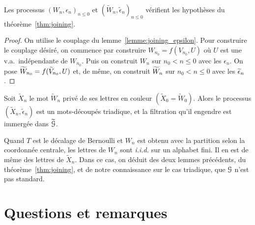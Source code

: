 \documentclass[12pt,a4paper]{article}
\begin{document}
\begin{lemme}
Les processus ${(W_n, \epsilon_n)}_{n \leq 0}$ et 
${(\widetilde{W}_n, \widetilde{\epsilon}_n)}_{n \leq 0}$ 
vérifient les hypothèses du théorème~\ref{thm:joining}. 
\end{lemme}

\begin{proof}
On utilise le couplage du lemme~\ref{lemme:joining_epsilon}. 
Pour construire le couplage désiré, on commence par construire $W_{n_0} = f(V_{n_0}, U)$ 
où $U$ est une v.a.\ indépendante de $W_{n_0}$. 
Puis on construit $W_n$ sur $n_0 < n \leq 0$ avec les $\epsilon_n$. 
On pose $\widetilde{W}_{n_0} = f(\widetilde{V}_{n_0}, U)$ et, de même, on 
 construit $\widetilde{W}_n$ sur $n_0 < n \leq 0$ avec les $\widetilde{\epsilon}_n$. 
\end{proof}

\begin{lemme}
Soit $\widetilde{X}_n$ le mot $\widetilde{W}_n$ privé de ses lettres en couleur $(\widetilde{X}_0=\widetilde{W}_0)$. 
Alors le processus $(\widetilde{X}_n, \widetilde{\epsilon}_n)$ est un mots-découpés triadique, 
et la filtration qu'il engendre est immergée dans $\widetilde{\EuScript{G}}$.
\end{lemme}

Quand $T$ est le décalage de Bernoulli et $W_n$ est obtenu avec la partition 
selon la coordonnée centrale, les lettres de $W_n$ sont \emph{i.i.d.} sur un alphabet 
fini. Il en est de même des lettres de $\widetilde{X}_n$. 
Dans ce cas, on déduit des deux lemmes précédents, du théorème~\ref{thm:joining}, 
et de notre connaissance sur le cas triadique, que $\EuScript{G}$ n'est pas standard. 

\section{Questions et remarques} 
\end{document}
